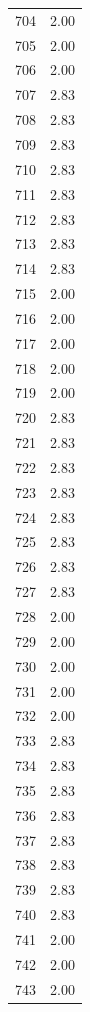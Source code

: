 \documentclass[a4paper,11pt]{article}
\begin{document}
\begin{center}
\begin{longtable}{|R{1.5cm}|R{2.5cm}|}
  704  &         2.00 \\ 
  705  &         2.00 \\ 
  706  &         2.00 \\ 
  707  &         2.83 \\ 
  708  &         2.83 \\ 
  709  &         2.83 \\ 
  710  &         2.83 \\ 
  711  &         2.83 \\ 
  712  &         2.83 \\ 
  713  &         2.83 \\ 
  714  &         2.83 \\ 
  715  &         2.00 \\ 
  716  &         2.00 \\ 
  717  &         2.00 \\ 
  718  &         2.00 \\ 
  719  &         2.00 \\ 
  720  &         2.83 \\ 
  721  &         2.83 \\ 
  722  &         2.83 \\ 
  723  &         2.83 \\ 
  724  &         2.83 \\ 
  725  &         2.83 \\ 
  726  &         2.83 \\ 
  727  &         2.83 \\ 
  728  &         2.00 \\ 
  729  &         2.00 \\ 
  730  &         2.00 \\ 
  731  &         2.00 \\ 
  732  &         2.00 \\ 
  733  &         2.83 \\ 
  734  &         2.83 \\ 
  735  &         2.83 \\ 
  736  &         2.83 \\ 
  737  &         2.83 \\ 
  738  &         2.83 \\ 
  739  &         2.83 \\ 
  740  &         2.83 \\ 
  741  &         2.00 \\ 
  742  &         2.00 \\ 
  743  &         2.00 \\ 

\end{longtable}
\end{center}
\end{document}
